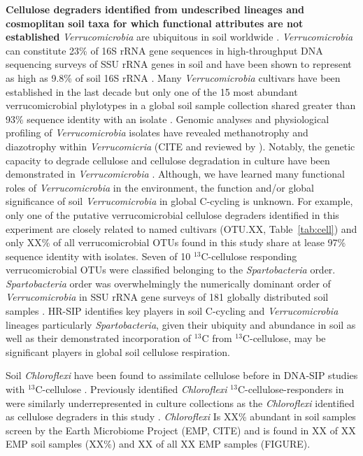 \textbf{Cellulose degraders identified from undescribed lineages and
cosmoplitan soil taxa for which functional attributes are not established}
\textit{Verrucomicrobia} are ubiquitous in soil worldwide
\citep{Bergmann_2011}.  \textit{Verrucomicrobia} can constitute 23\% of 16S
rRNA gene sequences in high-throughput DNA sequencing surveys of SSU rRNA genes
in soil \citep{Bergmann_2011} and have been shown to represent as high as 9.8\%
of soil 16S rRNA \citep{Buckley_2001}. Many \textit{Verrucomicrobia} cultivars
have been established in the last decade \cite{Wertz_2011} but only one of the
15 most abundant verrucomicrobial phylotypes in a global soil sample collection
shared greater than 93\% sequence identity with an isolate
\citep{Bergmann_2011}.  Genomic analyses and physiological profiling of
\textit{Verrucomicrobia} isolates have revealed methanotrophy and diazotrophy
\citep{Wertz_2011} within \textit{Verrucomicria} (CITE and reviewed by
\citet{Wertz_2011}). Notably, the genetic capacity to degrade cellulose and
cellulose degradation in culture have been demonstrated in
\textit{Verrucomicrobia} \citep{Otsuka_2012, Wertz_2011}.  Although, we have
learned many functional roles of \textit{Verrucomicrobia} in the environment,
the function and/or global significance of soil \textit{Verrucomicrobia} in
global C-cycling is unknown. For example, only one of the putative
verrucomicrobial cellulose degraders identified in this experiment are closely
related to named cultivars (OTU.XX, Table~\ref{tab:cell}) and only XX\% of all
verrucomicrobial OTUs found in this study share at lease 97\% sequence identity
with isolates. Seven of 10 $^{13}$C-cellulose responding verrucomicrobial OTUs were
classified belonging to the \textit{Spartobacteria} order.  \textit{Spartobacteria}
order was overwhelmingly the numerically dominant order of \textit{Verrucomicrobia} in
SSU rRNA gene surveys of 181 globally distributed soil samples
\citep{Bergmann_2011}. HR-SIP identifies key players in soil C-cycling and
\textit{Verrucomicrobia} lineages particularly \textit{Spartobacteria}, given
their ubiquity and abundance in soil as well as their demonstrated
incorporation of $^{13}$C from $^{13}$C-cellulose, may be significant players in
global soil cellulose respiration. 

Soil \textit{Chloroflexi} have been found to assimilate cellulose before in
DNA-SIP studies with $^{13}$C-cellulose \citep{Schellenberger_2010}. Previously
identified \textit{Chloroflexi} $^{13}$C-cellulose-responders in were similarly
underrepresented in culture collections as the \textit{Chloroflexi} identified as 
cellulose degraders in this study \citep{Schellenberger_2010}.
\textit{Chloroflexi} Is XX\% abundant in soil samples
screen by the Earth Microbiome Project (EMP, CITE) and is
found in XX of XX EMP soil samples (XX\%) and XX of all XX EMP samples
(FIGURE). 


